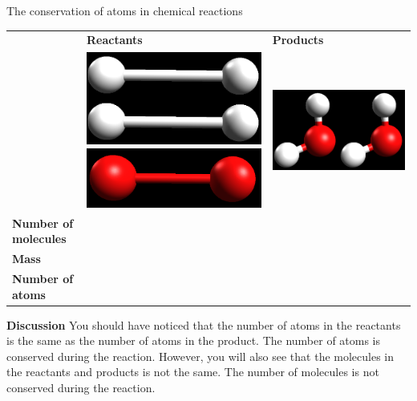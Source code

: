 \begin{activity}{The conservation of atoms in chemical reactions }
\begin{table}[H]
\begin{center}
\begin{tabular}{|l|l||l|}
& \textbf{Reactants} & \textbf{Products} \\ 
& \includegraphics[width=.1\textwidth]{photos/hydrogen.png} \includegraphics[width=.1\textwidth]{photos/oxygen.png} & \includegraphics[width=.1\textwidth]{photos/water.png} \\ \hline
   \textbf{Number of molecules} &  &  \\ \hline
\textbf{Mass} &  &  \\ \hline
\textbf{Number of atoms} &  &  \\ \hline
  \end{tabular}

 \end{center}

\end{table}

      \label{m38711*id65031}\noindent{}\textbf{Discussion}
     You should have noticed that the number of atoms in the reactants is the same as the number of atoms in the product. The number of atoms is conserved during the reaction. However, you will also see that the molecules in the reactants and products is not the same. The number of molecules is not conserved during the reaction.
 \par 
\end{activity}
\label{m38711*eip-14}
